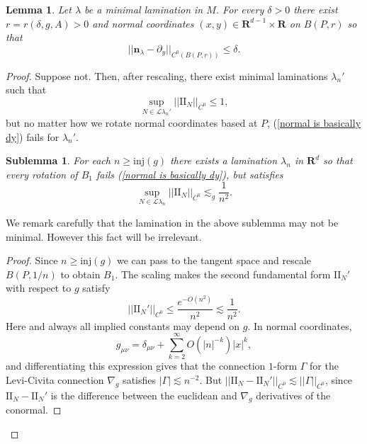 \documentclass[reqno,11pt]{amsart}
\newcommand{\RR}{\mathbf{R}}
\newcommand{\Leaves}{\mathscr L}
\newcommand{\Two}{\mathrm{I\!I}}
\newcommand{\normal}{\mathbf n}
\newcommand{\inj}{\mathrm{inj}}
\newtheorem{lemma}[theorem]{Lemma}
\newtheorem{sublemma}[theorem]{Sublemma}
\theoremstyle{definition}
\numberwithin{equation}{section}
\begin{document}
\begin{lemma}\label{lams have C0 fields}
	Let $\lambda$ be a minimal lamination in $M$.
	For every $\delta > 0$ there exist $r = r(\delta, g, A) > 0$ and normal coordinates $(x, y) \in \RR^{d - 1} \times \RR$ on $B(P, r)$ so that
\begin{equation}\label{normal is basically dy}
	||\normal_\lambda - \partial_y||_{C^0(B(P, r))} \leq \delta.
\end{equation}
\end{lemma}
\begin{proof}
	Suppose not.
	Then, after rescaling, there exist minimal laminations $\lambda_n'$ such that
	$$\sup_{N \in \Leaves \lambda_n'} ||\Two_N||_{C^0} \leq 1,$$
	but no matter how we rotate normal coordinates based at $P$, (\ref{normal is basically dy}) fails for $\lambda_n'$.

\begin{sublemma}
	For each $n \geq \inj(g)$ there exists a lamination $\lambda_n$ in $\RR^d$ so that every rotation of $B_1$ fails (\ref{normal is basically dy}), but satisfies
\begin{equation}\label{bounds on Two in representation}
	\sup_{N \in \Leaves \lambda_n} ||\Two_N||_{C^0} \lesssim_g \frac{1}{n^2}.
\end{equation}
\end{sublemma}

We remark carefully that the lamination in the above sublemma may not be minimal.
However this fact will be irrelevant.

\begin{proof}
	Since $n \geq \inj(g)$ we can pass to the tangent space and rescale $B(P, 1/n)$ to obtain $B_1$. The scaling makes the second fundamental form $\Two_N'$ with respect to $g$ satisfy
$$||\Two_N'||_{C^0} \leq \frac{e^{-O(n^2)}}{n^2} \lesssim \frac{1}{n^2}.$$
	Here and always all implied constants may depend on $g$.
	In normal coordinates,
	$$g_{\mu \nu} = \delta_{\mu \nu} + \sum_{k=2}^\infty O(|n|^{-k}) |x|^k,$$
	and differentiating this expression gives that the connection $1$-form $\Gamma$ for the Levi-Civita connection $\nabla_g$ satisfies $|\Gamma| \lesssim n^{-2}$.
	But $||\Two_N - \Two_N'||_{C^0} \lesssim ||\Gamma||_{C^0}$, since $\Two_N - \Two_N'$ is the difference between the euclidean and $\nabla_g$ derivatives of the conormal.
\end{proof}


\end{proof}
\end{document}
